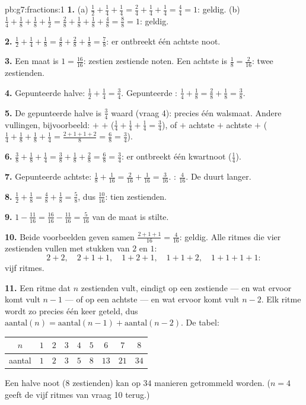 \begin{solution}{pb:g7:fractions:1}
\textbf{1.} (a) $\frac12 + \frac14 + \frac14 = \frac24 + \frac14 + \frac14 =
\frac44 = 1$: geldig. (b) $\frac14 + \frac18 + \frac18 + \frac12 = \frac28 +
\frac18 + \frac18 + \frac48 = \frac88 = 1$: geldig.

\textbf{2.} $\frac12 + \frac14 + \frac18 = \frac48 + \frac28 + \frac18 =
\frac78$: er ontbreekt één achtste noot.

\textbf{3.} Een maat is $1 = \frac{16}{16}$: zestien zestiende noten. Een achtste
is $\frac18 = \frac{2}{16}$: twee zestienden.

\textbf{4.} Gepunteerde halve: $\frac12 + \frac14 = \frac34$. Gepunteerde :
$\frac14 + \frac18 = \frac28 + \frac18 = \frac38$.

\textbf{5.} De gepunteerde halve is $\frac34$ waard (vraag 4): precies één
walsmaat. Andere vullingen, bijvoorbeeld:  $+$  $+$ 
($\frac14 + \frac14 + \frac14 = \frac34$), of  $+$ achtste $+$ achtste $+$
 ($\frac14 + \frac18 + \frac18 + \frac14 = \frac{2 + 1 + 1 + 2}{8} =
\frac68 = \frac34$).

\textbf{6.} $\frac38 + \frac18 + \frac14 = \frac38 + \frac18 + \frac28 =
\frac68 = \frac34$: er ontbreekt één kwartnoot ($\frac14$).

\textbf{7.} Gepunteerde achtste: $\frac18 + \frac{1}{16} = \frac{2}{16} +
\frac{1}{16} = \frac{3}{16}$. : $\frac{4}{16}$. De  duurt langer.

\textbf{8.} $\frac12 + \frac18 = \frac48 + \frac18 = \frac58$, dus
$\frac{10}{16}$: tien zestienden.

\textbf{9.} $1 - \frac{11}{16} = \frac{16}{16} - \frac{11}{16} = \frac{5}{16}$
van de maat is stilte.

\textbf{10.} Beide voorbeelden geven samen $\frac{2 + 1 + 1}{16} = \frac{4}{16}$:
geldig. Alle ritmes die vier zestienden vullen met stukken van $2$ en $1$:
\[
2{+}2, \quad 2{+}1{+}1, \quad 1{+}2{+}1, \quad 1{+}1{+}2, \quad
1{+}1{+}1{+}1 :
\]
vijf ritmes.

\textbf{11.} Een ritme dat $n$ zestienden vult, eindigt op een zestiende --- en
wat ervoor komt vult $n - 1$ --- of op een achtste --- en wat ervoor komt vult
$n - 2$. Elk ritme wordt zo precies één keer geteld, dus
$\text{aantal}(n) = \text{aantal}(n-1) + \text{aantal}(n-2)$. De tabel:
\begin{center}
\renewcommand{\arraystretch}{1.2}
\begin{tabular}{c|cccccccc}
$n$ & $1$ & $2$ & $3$ & $4$ & $5$ & $6$ & $7$ & $8$ \\
\hline
aantal & $1$ & $2$ & $3$ & $5$ & $8$ & $13$ & $21$ & $34$ \\
\end{tabular}
\end{center}
Een halve noot ($8$ zestienden) kan op $34$ manieren getrommeld worden. ($n = 4$
geeft de vijf ritmes van vraag 10 terug.)


\end{solution}
